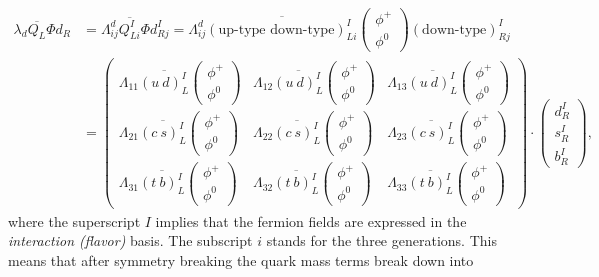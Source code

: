 \begin{equation}
\begin{split}
\lambda_d \overline{Q_L} \Phi d_R &= \Lambda^d_{ij}\overline{Q^I_{Li}} \Phi d^I_{Rj} = \Lambda^d_{ij}\overline{\left(\textrm{up-type down-type}\right)^I_{Li}} \begin{pmatrix} \phi^+ \\ \phi^0 \end{pmatrix}  \left(\textrm{down-type}\right)^I_{Rj} \\
&= \begin{pmatrix} 
\Lambda_{11}\overline{\left(u \ d\right)^I_L}\begin{pmatrix} \phi^+ \\ \phi^0 \end{pmatrix} &
\Lambda_{12}\overline{\left(u \ d\right)^I_L}\begin{pmatrix} \phi^+ \\ \phi^0 \end{pmatrix} &
\Lambda_{13}\overline{\left(u \ d\right)^I_L}\begin{pmatrix} \phi^+ \\ \phi^0 \end{pmatrix}\\  
\Lambda_{21}\overline{\left(c \ s\right)^I_L}\begin{pmatrix} \phi^+ \\ \phi^0 \end{pmatrix} &
\Lambda_{22}\overline{\left(c \ s\right)^I_L}\begin{pmatrix} \phi^+ \\ \phi^0 \end{pmatrix} &
\Lambda_{23}\overline{\left(c \ s\right)^I_L}\begin{pmatrix} \phi^+ \\ \phi^0 \end{pmatrix}\\
\Lambda_{31}\overline{\left(t \ b\right)^I_L}\begin{pmatrix} \phi^+ \\ \phi^0 \end{pmatrix} &
\Lambda_{32}\overline{\left(t \ b\right)^I_L}\begin{pmatrix} \phi^+ \\ \phi^0 \end{pmatrix} &
\Lambda_{33}\overline{\left(t \ b\right)^I_L}\begin{pmatrix} \phi^+ \\ \phi^0 \end{pmatrix}
\end{pmatrix}
\cdot \begin{pmatrix} d^I_R \\ s^I_R \\b^I_R \end{pmatrix},
\end{split}
\end{equation}
where the superscript $I$ implies that the fermion fields are expressed in the \textit{interaction (flavor)} basis. The subscript $i$ stands for the three generations. This means that after symmetry breaking the quark mass terms break down into

